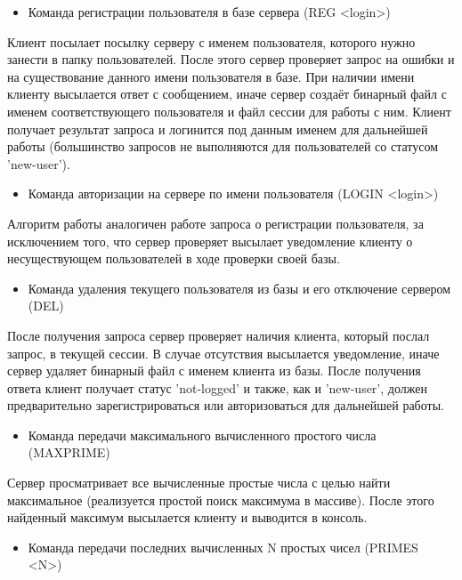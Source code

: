 \begin{itemize}
\item Команда регистрации пользователя в базе сервера (REG <login>)
\end{itemize}

Клиент посылает посылку серверу с именем пользователя, которого нужно занести в папку пользователей. После этого сервер проверяет запрос на ошибки и на существование данного имени пользователя в базе. При наличии имени клиенту высылается ответ с сообщением, иначе сервер создаёт бинарный файл с именем соответствующего пользователя и файл сессии для работы с ним. Клиент получает результат запроса и логинится под данным именем для дальнейшей работы (большинство запросов не выполняются для пользователей со статусом 'new-user').

\begin{itemize}
\item Команда авторизации на сервере по имени пользователя (LOGIN <login>)
\end{itemize}

Алгоритм работы аналогичен работе запроса о регистрации пользователя, за исключением того, что сервер проверяет высылает уведомление клиенту о несуществующем пользователей в ходе проверки своей базы.

\begin{itemize}
\item Команда удаления текущего пользователя из базы и его отключение сервером (DEL)

\end{itemize}

После получения запроса сервер проверяет наличия клиента, который послал запрос, в текущей сессии. В случае отсутствия высылается уведомление, иначе сервер удаляет бинарный файл с именем клиента из базы. После получения ответа клиент получает статус 'not-logged' и также, как и 'new-user', должен предварительно зарегистрироваться или авторизоваться для дальнейшей работы.

\begin{itemize}
\item Команда передачи максимального вычисленного простого числа (MAXPRIME)
\end{itemize}

Сервер просматривает все вычисленные простые числа с целью найти максимальное (реализуется простой поиск максимума в массиве). После этого найденный максимум высылается клиенту и выводится в консоль.

\begin{itemize}
	\item Команда передачи последних вычисленных N простых чисел (PRIMES <N>)
\end{itemize}

